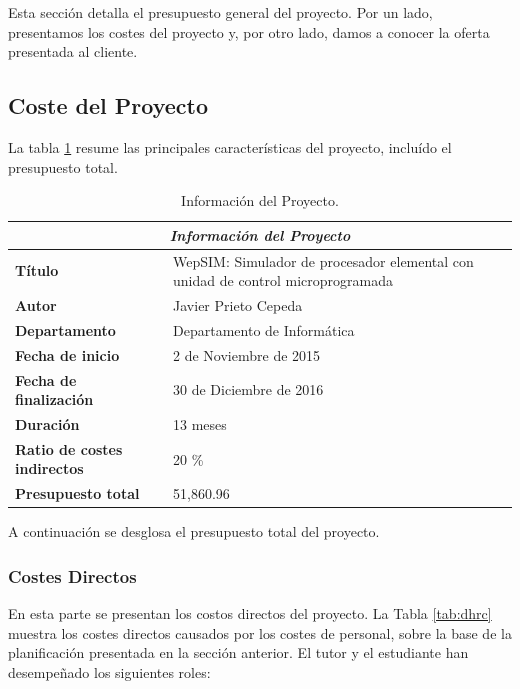 Esta sección detalla el presupuesto general del proyecto. Por un lado, presentamos los costes del proyecto y, por otro lado, damos a conocer la oferta presentada al cliente.

\subsection{Coste del Proyecto}

La tabla \ref{tab:project_information} resume las principales características del proyecto, incluído el presupuesto total.

\begin{center}
\begin{table}[htbp]
\centering
\begin{tabular}{@{}p{3.5cm} p{9cm}@{}} 
\toprule
\multicolumn{2}{c}{\textbf{\textit{Información del Proyecto}}}\\
\midrule
\textbf{Título} 					& WepSIM: Simulador de procesador elemental con unidad de control microprogramada \\
\midrule
\textbf{Autor} 					& Javier Prieto Cepeda \\
\midrule
\textbf{Departamento} 				& Departamento de Informática \\
\midrule
\textbf{Fecha de inicio}				&2 de Noviembre de 2015 \\
\midrule
\textbf{Fecha de finalización}				& 30 de Diciembre de 2016 \\
\midrule
\textbf{Duración} 				& 13 meses \\
\midrule
\textbf{Ratio de costes indirectos} 	& 20 \% \\
\midrule
\textbf{Presupuesto total} 			& 51,860.96 \\
\bottomrule
\end{tabular}
\caption{Información del Proyecto.}
\label{tab:project_information}
\end{table}
\end{center}

A continuación se desglosa el presupuesto total del proyecto.

\subsubsection{Costes Directos}

En esta parte se presentan los costos directos del proyecto. La Tabla \ref{tab:dhrc} muestra los costes directos causados por los costes de personal, sobre la base de la planificación presentada en la sección anterior. El tutor y el estudiante han desempeñado los siguientes roles:

